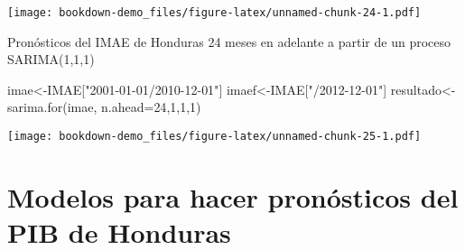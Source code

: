 \documentclass[
]{book}
\newenvironment{Shaded}{\begin{snugshade}}{\end{snugshade}}
\newcommand{\AttributeTok}[1]{\textcolor[rgb]{0.77,0.63,0.00}{#1}}
\newcommand{\ConstantTok}[1]{\textcolor[rgb]{0.00,0.00,0.00}{#1}}
\newcommand{\DecValTok}[1]{\textcolor[rgb]{0.00,0.00,0.81}{#1}}
\newcommand{\FunctionTok}[1]{\textcolor[rgb]{0.00,0.00,0.00}{#1}}
\newcommand{\NormalTok}[1]{#1}
\newcommand{\OtherTok}[1]{\textcolor[rgb]{0.56,0.35,0.01}{#1}}
\newcommand{\SpecialCharTok}[1]{\textcolor[rgb]{0.00,0.00,0.00}{#1}}
\newcommand{\StringTok}[1]{\textcolor[rgb]{0.31,0.60,0.02}{#1}}
\begin{document}
\begin{Shaded}
\end{Shaded}

\texttt{[image: bookdown-demo\_files/figure-latex/unnamed-chunk-24-1.pdf]}

Pronósticos del IMAE de Honduras 24 meses en adelante a partir de un proceso SARIMA(1,1,1)

\begin{Shaded}
\begin{Highlighting}[]
\NormalTok{imae}\OtherTok{\textless{}{-}}\NormalTok{IMAE[}\StringTok{"2001{-}01{-}01/2010{-}12{-}01"}\NormalTok{]}
\NormalTok{imaef}\OtherTok{\textless{}{-}}\NormalTok{IMAE[}\StringTok{"/2012{-}12{-}01"}\NormalTok{]}
\NormalTok{resultado}\OtherTok{\textless{}{-}}\FunctionTok{sarima.for}\NormalTok{(imae, }\AttributeTok{n.ahead=}\DecValTok{24}\NormalTok{,}\DecValTok{1}\NormalTok{,}\DecValTok{1}\NormalTok{,}\DecValTok{1}\NormalTok{)}
\end{Highlighting}
\end{Shaded}

\texttt{[image: bookdown-demo\_files/figure-latex/unnamed-chunk-25-1.pdf]}

\hypertarget{modelos-para-hacer-pronuxf3sticos-del-pib-de-honduras}{%
\section{Modelos para hacer pronósticos del PIB de Honduras}\label{modelos-para-hacer-pronuxf3sticos-del-pib-de-honduras}}
\end{document}
